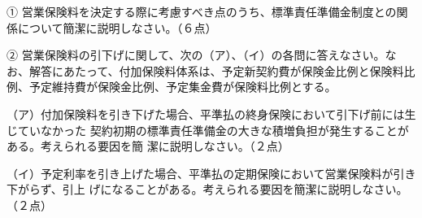 \documentclass[report,gutter=10mm,fore-edge=10mm,uplatex,dvipdfmx]{jlreq}
\begin{document}


① 営業保険料を決定する際に考慮すべき点のうち、標準責任準備金制度との関係について簡潔に説明しなさい。（６点）

② 営業保険料の引下げに関して、次の（ア）、（イ）の各問に答えなさい。なお、解答にあたって、付加保険料体系は、予定新契約費が保険金比例と保険料比例、予定維持費が保険金比例、予定集金費が保険料比例とする。

（ア）付加保険料を引き下げた場合、平準払の終身保険において引下げ前には生じていなかった
契約初期の標準責任準備金の大きな積増負担が発生することがある。考えられる要因を簡
潔に説明しなさい。（２点）

（イ）予定利率を引き上げた場合、平準払の定期保険において営業保険料が引き下がらず、引上
げになることがある。考えられる要因を簡潔に説明しなさい。（２点）

\end{document}
